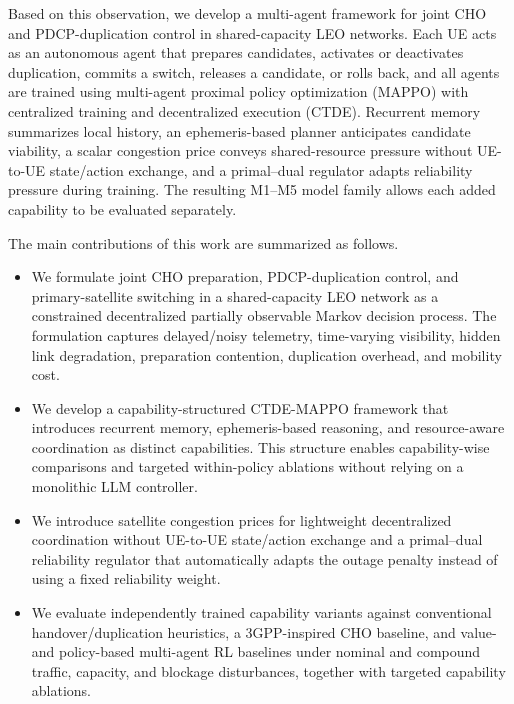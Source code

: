 \documentclass[journal]{IEEEtran}
\begin{document}
Based on this observation, we develop a multi-agent framework for joint CHO
and PDCP-duplication control in shared-capacity LEO networks. Each UE acts as
an autonomous agent that prepares candidates, activates or deactivates
duplication, commits a switch, releases a candidate, or rolls back, and all
agents are trained using multi-agent proximal policy optimization (MAPPO) with
centralized training and decentralized execution (CTDE). Recurrent memory
summarizes local history, an ephemeris-based planner anticipates candidate
viability, a scalar congestion price conveys shared-resource pressure without
UE-to-UE state/action exchange, and a primal--dual regulator adapts reliability
pressure during training. The resulting M1--M5 model family allows each added
capability to be evaluated separately.

The main contributions of this work are summarized as follows.

\begin{itemize}
    \item We formulate joint CHO preparation, PDCP-duplication control, and
    primary-satellite switching in a shared-capacity LEO network as a
    constrained decentralized partially observable Markov decision process.
    The formulation captures delayed/noisy telemetry, time-varying visibility,
    hidden link degradation, preparation contention, duplication overhead, and
    mobility cost.

    \item We develop a capability-structured CTDE-MAPPO framework that
    introduces recurrent memory, ephemeris-based reasoning, and
    resource-aware coordination as distinct capabilities. This structure
    enables capability-wise comparisons and targeted within-policy ablations
    without relying on a monolithic LLM controller.

    \item We introduce satellite congestion prices for lightweight
    decentralized coordination without UE-to-UE state/action exchange and a
    primal--dual reliability regulator that automatically adapts the outage
    penalty instead of using a fixed reliability weight.

    \item We evaluate independently trained capability variants against
    conventional handover/duplication heuristics, a 3GPP-inspired CHO
    baseline, and value- and policy-based multi-agent RL baselines under nominal and compound traffic, capacity, and blockage
    disturbances, together with targeted capability ablations.
\end{itemize}
\end{document}
